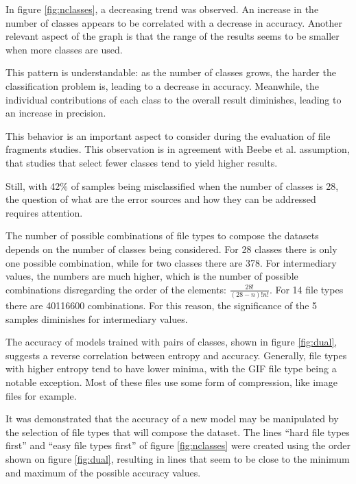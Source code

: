 

In figure \ref{fig:nclasses}, a decreasing trend was observed. An increase in the number of classes appears to be  correlated with a decrease in accuracy. Another relevant aspect of the graph is that the range of the results seems to be smaller when more classes are used.  

This pattern is understandable: as the number of classes grows, the harder the classification problem is, leading to a decrease in accuracy. Meanwhile, the individual contributions of each class to the overall result diminishes, leading to an increase in precision.

This behavior is an important aspect to consider during the evaluation of file fragments studies. This observation is in agreement with Beebe et al. \cite{beebe_sceadan:_2013} assumption, that studies that select fewer classes tend to yield higher results. 

Still, with 42\% of samples being misclassified when the number of classes is 28, the question of what are the error sources and how they can be addressed requires attention.

The number of possible combinations of file types to compose the datasets depends on the number of classes being considered. For 28 classes there is only one possible combination, while for two classes there are 378. For intermediary values, the numbers are much higher, which is the number of possible combinations disregarding the order of the elements: $ \frac{28!}{(28-n)!n!}$. For 14 file types there are 40116600 combinations. For this reason, the significance of the 5 samples diminishes for intermediary values.


The accuracy of models trained with pairs of classes, shown in figure \ref{fig:dual}, suggests a reverse correlation between entropy and accuracy.  Generally, file types with higher entropy tend to have lower minima, with the GIF file type being a notable exception. Most of these files use some form of compression, like image files for example.

It was demonstrated that the accuracy of a new model may be manipulated by the selection of file types that will compose the dataset. The lines ``hard file types first'' and ``easy file types first'' of figure \ref{fig:nclasses} were created using the order shown on figure \ref{fig:dual}, resulting in lines that seem to be close to the minimum and maximum of the possible accuracy values. 

